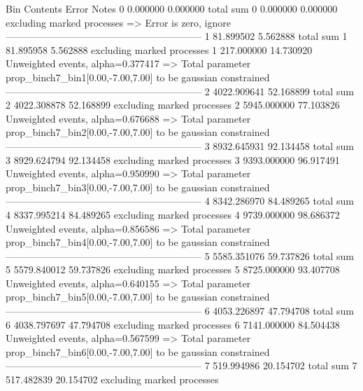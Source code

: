 Bin        Contents        Error           Notes                         
0          0.000000        0.000000        total sum                     
0          0.000000        0.000000        excluding marked processes    
  => Error is zero, ignore      
------------------------------------------------------------
1          81.899502       5.562888        total sum                     
1          81.895958       5.562888        excluding marked processes    
1          217.000000      14.730920       Unweighted events, alpha=0.377417
  => Total parameter prop_binch7_bin1[0.00,-7.00,7.00] to be gaussian constrained
------------------------------------------------------------
2          4022.909641     52.168899       total sum                     
2          4022.308878     52.168899       excluding marked processes    
2          5945.000000     77.103826       Unweighted events, alpha=0.676688
  => Total parameter prop_binch7_bin2[0.00,-7.00,7.00] to be gaussian constrained
------------------------------------------------------------
3          8932.645931     92.134458       total sum                     
3          8929.624794     92.134458       excluding marked processes    
3          9393.000000     96.917491       Unweighted events, alpha=0.950990
  => Total parameter prop_binch7_bin3[0.00,-7.00,7.00] to be gaussian constrained
------------------------------------------------------------
4          8342.286970     84.489265       total sum                     
4          8337.995214     84.489265       excluding marked processes    
4          9739.000000     98.686372       Unweighted events, alpha=0.856586
  => Total parameter prop_binch7_bin4[0.00,-7.00,7.00] to be gaussian constrained
------------------------------------------------------------
5          5585.351076     59.737826       total sum                     
5          5579.840012     59.737826       excluding marked processes    
5          8725.000000     93.407708       Unweighted events, alpha=0.640155
  => Total parameter prop_binch7_bin5[0.00,-7.00,7.00] to be gaussian constrained
------------------------------------------------------------
6          4053.226897     47.794708       total sum                     
6          4038.797697     47.794708       excluding marked processes    
6          7141.000000     84.504438       Unweighted events, alpha=0.567599
  => Total parameter prop_binch7_bin6[0.00,-7.00,7.00] to be gaussian constrained
------------------------------------------------------------
7          519.994986      20.154702       total sum                     
7          517.482839      20.154702       excluding marked processes    
